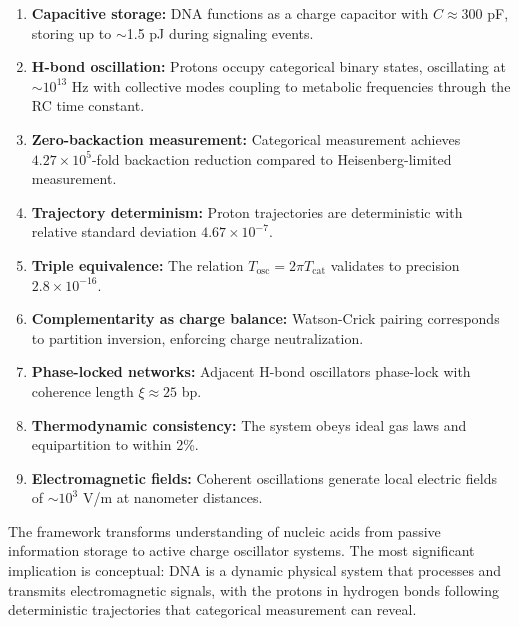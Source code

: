 \documentclass[twocolumn,10pt]{article}
\theoremstyle{remark}
\begin{document}
\begin{enumerate}
\item \textbf{Capacitive storage:} DNA functions as a charge capacitor with $C \approx 300$ pF, storing up to $\sim$1.5 pJ during signaling events.

\item \textbf{H-bond oscillation:} Protons occupy categorical binary states, oscillating at $\sim$$10^{13}$ Hz with collective modes coupling to metabolic frequencies through the RC time constant.

\item \textbf{Zero-backaction measurement:} Categorical measurement achieves $4.27 \times 10^5$-fold backaction reduction compared to Heisenberg-limited measurement.

\item \textbf{Trajectory determinism:} Proton trajectories are deterministic with relative standard deviation $4.67 \times 10^{-7}$.

\item \textbf{Triple equivalence:} The relation $T_{\mathrm{osc}} = 2\pi T_{\mathrm{cat}}$ validates to precision $2.8 \times 10^{-16}$.

\item \textbf{Complementarity as charge balance:} Watson-Crick pairing corresponds to partition inversion, enforcing charge neutralization.

\item \textbf{Phase-locked networks:} Adjacent H-bond oscillators phase-lock with coherence length $\xi \approx 25$ bp.

\item \textbf{Thermodynamic consistency:} The system obeys ideal gas laws and equipartition to within 2\%.

\item \textbf{Electromagnetic fields:} Coherent oscillations generate local electric fields of $\sim$$10^3$ V/m at nanometer distances.
\end{enumerate}

The framework transforms understanding of nucleic acids from passive information storage to active charge oscillator systems. The most significant implication is conceptual: DNA is a dynamic physical system that processes and transmits electromagnetic signals, with the protons in hydrogen bonds following deterministic trajectories that categorical measurement can reveal.



\end{document}

